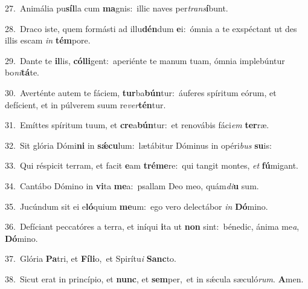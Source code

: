 {\numbfont\textcolor{\numbcolor}{27.}}~Animália pu\-\textbf{síl}\-la cum \textbf{ma}\-gnis:~\star illic naves per\-\textit{trans}\-\textbf{í}bunt.\par
{\numbfont\textcolor{\numbcolor}{28.}}~Draco iste, quem formásti ad illu\-\textbf{dén}\-dum \textbf{e}\-i:~\star ómnia a te exspéctant ut des illis escam \textit{in} \textbf{tém}\-pore.\par
{\numbfont\textcolor{\numbcolor}{29.}}~Dante te \textbf{il}\-lis, \textbf{cól}\-\textbf{li}gent:~\star aperiénte te manum tuam, ómnia implebúntur bo\-\textit{ni}\-\textbf{tá}te.\par
{\numbfont\textcolor{\numbcolor}{30.}}~Averténte autem te fáciem, \textbf{tur}\-ba\-\textbf{bún}\-tur:~\star áuferes spíritum eórum, et defícient, et in púlverem suum re\-\textit{ver}\-\textbf{tén}tur.\par
{\numbfont\textcolor{\numbcolor}{31.}}~Emíttes spíritum tuum, et \textbf{cre}\-a\-\textbf{bún}\-tur:~\star et renovábis fáci\textit{em} \textbf{ter}\-ræ.\par
{\numbfont\textcolor{\numbcolor}{32.}}~Sit glória Dómi\textbf{ni} in \textbf{sǽ}\-\textbf{cu}lum:~\star lætábitur Dóminus in opéri\textit{bus} \textbf{su}\-is:\par
{\numbfont\textcolor{\numbcolor}{33.}}~Qui réspicit terram, et facit \textbf{e}\-am \textbf{tré}\-\textbf{me}re:~\star qui tangit montes, \textit{et} \textbf{fú}\-migant.\par
{\numbfont\textcolor{\numbcolor}{34.}}~Cantábo Dómino in \textbf{vi}\-ta \textbf{me}\-a:~\star psallam Deo meo, quám\-\textit{di}\-\textbf{u} sum.\par
{\numbfont\textcolor{\numbcolor}{35.}}~Jucúndum sit ei e\-\textbf{ló}\-quium \textbf{me}\-um:~\star ego vero delectábor \textit{in} \textbf{Dó}\-mino.\par
{\numbfont\textcolor{\numbcolor}{36.}}~Defíciant peccatóres a terra, et iníqui \textbf{i}\-ta ut \textbf{non} sint:~\star bénedic, ánima me\-\textit{a}\-, \textbf{Dó}\-mino.\par
{\numbfont\textcolor{\numbcolor}{37.}}~Glória \textbf{Pa}\-tri, et \textbf{Fí}\-\textbf{li}o,~\star et Spirítu\textit{i} \textbf{Sanc}\-to.\par
{\numbfont\textcolor{\numbcolor}{38.}}~Sicut erat in princípio, et \textbf{nunc}\-, et \textbf{sem}\-per,~\star et in sǽcula sæculó\-\textit{rum}\-. \textbf{A}\-men.\par
